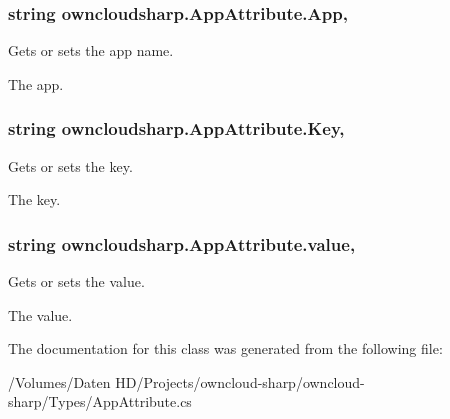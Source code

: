 \subsubsection[{App}]{\setlength{\rightskip}{0pt plus 5cm}string owncloudsharp.\+App\+Attribute.\+App\hspace{0.3cm}{\ttfamily [get]}, {\ttfamily [set]}}\label{classowncloudsharp_1_1_app_attribute_a2e61b9d68112b9f9cf9b4ee21cf8fcf5}


Gets or sets the app name. 

The app.\hypertarget{classowncloudsharp_1_1_app_attribute_a769a8bd5697d9f17fbb51060195f4a3a}{}
\subsubsection[{Key}]{\setlength{\rightskip}{0pt plus 5cm}string owncloudsharp.\+App\+Attribute.\+Key\hspace{0.3cm}{\ttfamily [get]}, {\ttfamily [set]}}\label{classowncloudsharp_1_1_app_attribute_a769a8bd5697d9f17fbb51060195f4a3a}


Gets or sets the key. 

The key.\hypertarget{classowncloudsharp_1_1_app_attribute_aad12b395949ee28c8c9fd9c2d6980dce}{}
\subsubsection[{value}]{\setlength{\rightskip}{0pt plus 5cm}string owncloudsharp.\+App\+Attribute.\+value\hspace{0.3cm}{\ttfamily [get]}, {\ttfamily [set]}}\label{classowncloudsharp_1_1_app_attribute_aad12b395949ee28c8c9fd9c2d6980dce}


Gets or sets the value. 

The value.

The documentation for this class was generated from the following file\+:\begin{DoxyCompactItemize}
\item 
/\+Volumes/\+Daten H\+D/\+Projects/owncloud-\/sharp/owncloud-\/sharp/\+Types/App\+Attribute.\+cs\end{DoxyCompactItemize}
